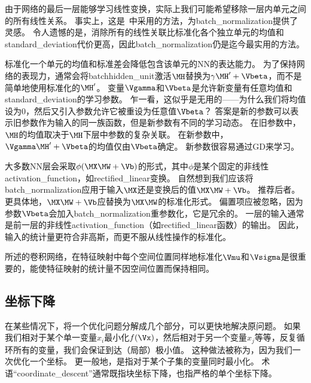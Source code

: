 由于网络的最后一层能够学习线性变换，实际上我们可能希望移除一层内单元之间的所有线性关系。
事实上，这是~\cite{Desjardins-et-al-2015}中采用的方法，为\gls{batch_normalization}提供了灵感。
令人遗憾的是，消除所有的线性关联比标准化各个独立单元的均值和\gls{standard_deviation}代价更高，因此\gls{batch_normalization}仍是迄今最实用的方法。


标准化一个单元的均值和标准差会降低包含该单元的\gls{NN}的表达能力。
为了保持网络的表现力，通常会将\gls{batch}\gls{hidden_unit}激活$\MH$替换为$\gamma \MH' + \Vbeta$，而不是简单地使用标准化的$\MH'$。
变量$\Vgamma$和$\Vbeta$是允许新变量有任意均值和\gls{standard_deviation}的学习参数。
乍一看，这似乎是无用的——为什么我们将均值设为$0$，然后又引入参数允许它被重设为任意值$\Vbeta$？
答案是新的参数可以表示旧参数作为输入的同一族函数，但是新参数有不同的学习动态。
在旧参数中，$\MH$的均值取决于$\MH$下层中参数的复杂关联。
在新参数中，$\Vgamma \MH' + \Vbeta$的均值仅由$\Vbeta$确定。
新参数很容易通过\gls{GD}来学习。

大多数\gls{NN}层会采取$\phi(\MX\MW+ \Vb)$的形式，其中$\phi$是某个固定的非线性\gls{activation_function}，如\gls{rectified_linear}变换。
自然想到我们应该将\gls{batch_normalization}应用于输入$\MX$还是变换后的值$\MX\MW+\Vb$。
\cite{Ioffe-Szegedy-2015}推荐后者。
更具体地，$\MX\MW+\Vb$应替换为$\MX\MW$的标准化形式。
偏置项应被忽略，因为参数$\Vbeta$会加入\gls{batch_normalization}重参数化，它是冗余的。
一层的输入通常是前一层的非线性\gls{activation_function}（如\gls{rectified_linear}函数）的输出。
因此，输入的统计量更符合非高斯，而更不服从线性操作的标准化。

所述的卷积网络，在特征映射中每个空间位置同样地标准化$\Vmu$和$\Vsigma$是很重要的，能使特征映射的统计量不因空间位置而保持相同。

\subsection{坐标下降}
\label{sec:coordinate_descent}
在某些情况下，将一个优化问题分解成几个部分，可以更快地解决原问题。
如果我们相对于某个单一变量$x_i$最小化$f(\Vx)$，然后相对于另一个变量$x_j$等等，反复循环所有的变量，我们会保证到达（局部）极小值。
这种做法被称为，因为我们一次优化一个坐标。
更一般地，是指对于某个子集的变量同时最小化。
术语``\gls{coordinate_descent}''通常既指块坐标下降，也指严格的单个坐标下降。



